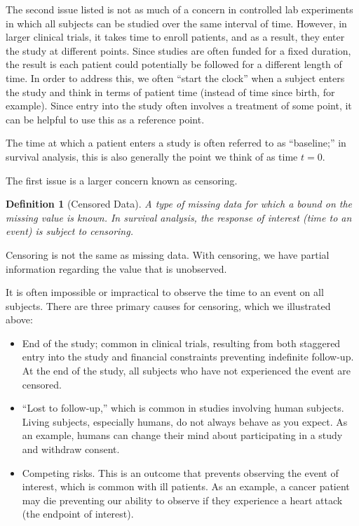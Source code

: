 \documentclass[
]{book}
\providecommand{\tightlist}{%
  \setlength{\itemsep}{0pt}\setlength{\parskip}{0pt}}
\theoremstyle{plain}
\theoremstyle{mydefn}
\newtheorem{definition}{Definition}[chapter]
\theoremstyle{myexmpl}
\theoremstyle{remark}
\begin{document}
The second issue listed is not as much of a concern in controlled lab experiments in which all subjects can be studied over the same interval of time. However, in larger clinical trials, it takes time to enroll patients, and as a result, they enter the study at different points. Since studies are often funded for a fixed duration, the result is each patient could potentially be followed for a different length of time. In order to address this, we often ``start the clock'' when a subject enters the study and think in terms of patient time (instead of time since birth, for example). Since entry into the study often involves a treatment of some point, it can be helpful to use this as a reference point.

\begin{rmdtip}
The time at which a patient enters a study is often referred to as ``baseline;'' in survival analysis, this is also generally the point we think of as time \(t = 0\).
\end{rmdtip}

The first issue is a larger concern known as censoring.

\begin{definition}[Censored Data]
\protect\hypertarget{def:defn-censored-data}{}{\label{def:defn-censored-data} {} }A type of missing data for which a bound on the missing value is known. In survival analysis, the response of interest (time to an event) is subject to censoring.
\end{definition}

\begin{rmdwarning}
Censoring is not the same as missing data. With censoring, we have partial information regarding the value that is unobserved.
\end{rmdwarning}

It is often impossible or impractical to observe the time to an event on all subjects. There are three primary causes for censoring, which we illustrated above:

\begin{itemize}
\tightlist
\item
  End of the study; common in clinical trials, resulting from both staggered entry into the study and financial constraints preventing indefinite follow-up. At the end of the study, all subjects who have not experienced the event are censored.
\item
  ``Lost to follow-up,'' which is common in studies involving human subjects. Living subjects, especially humans, do not always behave as you expect. As an example, humans can change their mind about participating in a study and withdraw consent.
\item
  Competing risks. This is an outcome that prevents observing the event of interest, which is common with ill patients. As an example, a cancer patient may die preventing our ability to observe if they experience a heart attack (the endpoint of interest).
\end{itemize}
\end{document}
